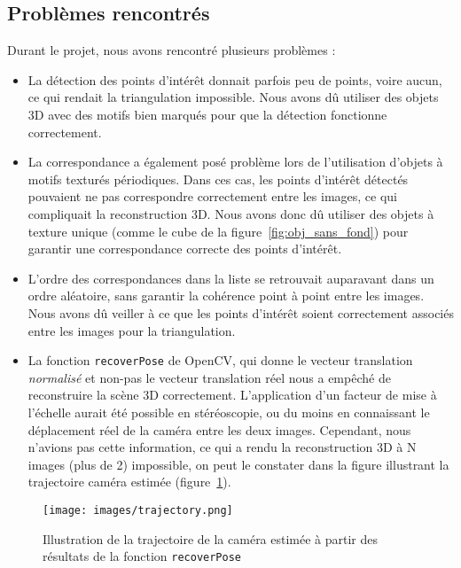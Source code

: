 \documentclass[12pt]{article}
\begin{document}
\subsection{Problèmes rencontrés}

Durant le projet, nous avons rencontré plusieurs problèmes :
\begin{itemize}
    \item La détection des points d'intérêt donnait parfois peu de points, voire aucun, ce qui rendait la triangulation impossible. Nous avons dû utiliser des objets 3D avec des motifs bien marqués pour que la détection fonctionne correctement.
    \item La correspondance a également posé problème lors de l'utilisation d'objets à motifs texturés périodiques. Dans ces cas, les points d'intérêt détectés pouvaient ne pas correspondre correctement entre les images, ce qui compliquait la reconstruction 3D. Nous avons donc dû utiliser des objets à texture unique (comme le cube de la figure~\ref{fig:obj_sans_fond}) pour garantir une correspondance correcte des points d'intérêt.
    \item L'ordre des correspondances dans la liste se retrouvait auparavant dans un ordre aléatoire, sans garantir la cohérence point à point entre les images. Nous avons dû veiller à ce que les points d'intérêt soient correctement associés entre les images pour la triangulation.
    \item La fonction \texttt{recoverPose} de OpenCV, qui donne le vecteur translation \textit{normalisé} et non-pas le vecteur translation réel nous a empêché de reconstruire la scène 3D correctement. L'application d'un facteur de mise à l'échelle aurait été possible en stéréoscopie, ou du moins en connaissant le déplacement réel de la caméra entre les deux images. Cependant, nous n'avions pas cette information, ce qui a rendu la reconstruction 3D à N images (plus de 2) impossible, on peut le constater dans la figure illustrant la trajectoire caméra estimée (figure~\ref{fig:trajectory}).
\end{itemize}

\begin{figure}[H]
\centering
\texttt{[image: images/trajectory.png]}
\caption{Illustration de la trajectoire de la caméra estimée à partir des résultats de la fonction \texttt{recoverPose}}
\label{fig:trajectory}
\end{figure}

\newpage
\end{document}
